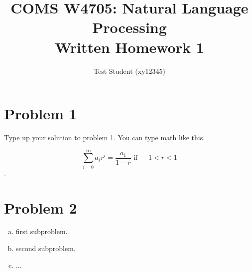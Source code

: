 \documentclass[11pt]{article}
\begin{document}
 
 
\title{COMS W4705: Natural Language Processing\\
       Written Homework 1}
\author{Test Student (xy12345)} %
\maketitle

\section*{Problem 1} 
 
Type up your solution to problem 1. You can type math like this. 

$$\sum\limits_{i=0}^\infty a_i r^i = \frac{a_1}{1-r} \text{ if } -1 < r < 1$$.

\section*{Problem 2}

\begin{enumerate}[(a)]
    \item first subproblem. 
    \item second subproblem.
    \item ...
\end{enumerate}

 
\end{document}
